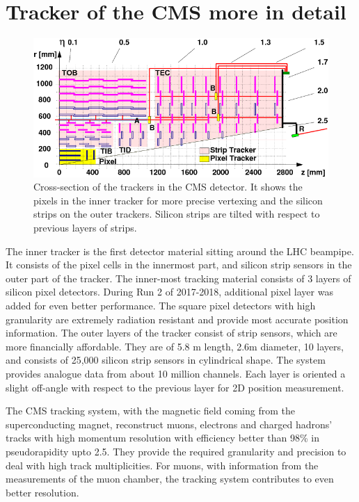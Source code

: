 \section{Tracker of the CMS more in detail}
\begin{figure}[h!]
	\caption{Cross-section of the trackers in the CMS detector. It shows the pixels in the inner tracker for more precise vertexing and the silicon strips on the outer trackers. Silicon strips are tilted with respect to previous layers of strips. \cite{trk}}
  \label{fig:tracker}
  \centering
  \includegraphics[width=0.9\linewidth]{figs/Tracker.png}
\end{figure}

The inner tracker is the first detector material sitting around the LHC beampipe. 
It consists of the pixel cells in the innermost part, and silicon strip sensors in the outer part of the tracker.
The inner-most tracking material consists of 3 layers of silicon pixel detectors. 
During Run 2 of 2017-2018, additional pixel layer was added for even better performance.
The square pixel detectors with high granularity are extremely radiation resistant and provide most accurate position information.
The outer layers of the tracker consist of strip sensors, which are more financially affordable.
They are of 5.8 m length, 2.6m diameter, 10 layers, and consists of 25,000 silicon strip sensors in cylindrical shape. 
The system provides analogue data from about 10 million channels. 
Each layer is oriented a slight off-angle with respect to the previous layer for 2D position measurement.

The CMS tracking system, with the magnetic field coming from the superconducting magnet, reconstruct muons, electrons and charged hadrons' tracks with high momentum resolution with efficiency better than 98\% in pseudorapidity upto 2.5.
They provide the required granularity and precision to deal with high track multiplicities.
For muons, with information from the measurements of the muon chamber, the tracking system contributes to even better resolution.

